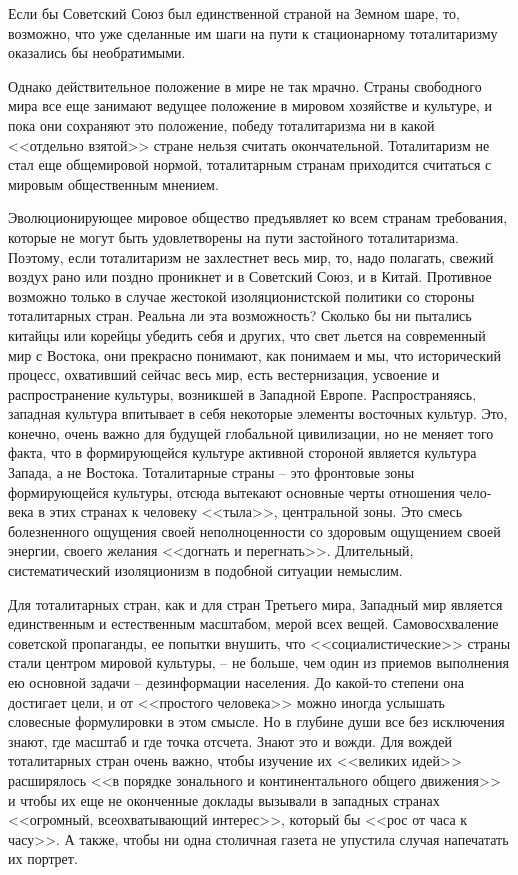 \documentclass{book}
\begin{document}
Если бы Советский Союз был единственной страной на Земном шаре, то, возможно, что уже сделанные им шаги на пути к стационарному тоталитаризму оказались бы необратимыми.

Однако действительное положение в мире не так мрачно. Страны свободного мира все еще занимают ведущее положение в мировом хозяйстве и культуре, и пока они сохраняют это поло­жение, победу тоталитаризма ни в какой <<отдельно взятой>> стране нельзя считать окончательной. Тоталитаризм не стал еще общемировой нормой, тоталитарным странам приходится считаться с мировым общественным мнением.

Эволюционирующее мировое общество предъявляет ко всем странам требования, которые не могут быть удовлетво­рены на пути застойного тоталитаризма. Поэтому, если тотали­таризм не захлестнет весь мир, то, надо полагать, свежий воз­дух рано или поздно проникнет и в Советский Союз, и в Ки­тай. Противное возможно только в случае жестокой изоляци­онистской политики со стороны тоталитарных стран. Реальна ли эта возможность? Сколько бы ни пытались китайцы или ко­рейцы убедить себя и других, что свет льется на современный мир с Востока, они прекрасно понимают, как понимаем и мы, что исторический процесс, охвативший сейчас весь мир, есть вестернизация,  усвоение и распространение культуры, возник­шей в Западной Европе. Распространяясь, западная культура впитывает в себя некоторые элементы восточных культур. Это, конечно, очень важно для будущей глобальной цивили­зации, но не меняет того факта, что в формирующейся культу­ре активной стороной является культура Запада, а не Востока. Тоталитарные страны -- это фронтовые 
зоны формирующейся культуры, отсюда вытекают основные черты отношения чело­века в этих странах к человеку <<тыла>>, центральной зоны. Это смесь болезненного ощущения своей неполноценности со здо­ровым ощущением своей энергии, своего желания <<догнать и перегнать>>. Длительный, систематический изоляционизм в по­добной ситуации немыслим.

Для тоталитарных стран, как и для стран Третьего мира, Западный мир является единственным и естественным масшта­бом, мерой всех вещей. Самовосхваление советской пропаган­ды, ее попытки внушить, что <<социалистические>> страны ста­ли центром мировой культуры, -- не больше, чем один из при­емов выполнения ею основной задачи -- дезинформации насе­ления. До какой-то степени она достигает цели, и от <<простого человека>> можно иногда услышать словесные формулировки в этом смысле. Но в глубине души все без исключения знают, где масштаб и где точка отсчета. Знают это и вожди. Для вож­дей тоталитарных стран очень важно, чтобы изучение их <<вели­ких идей>> расширялось <<в порядке зонального и континенталь­ного общего движения>> и чтобы их еще не оконченные докла­ды вызывали в западных странах <<огромный, всеохватываю­щий интерес>>, который бы <<рос от часа к часу>>. А также, чтобы ни одна столичная газета не упустила случая напечатать их порт­рет.
\end{document}
